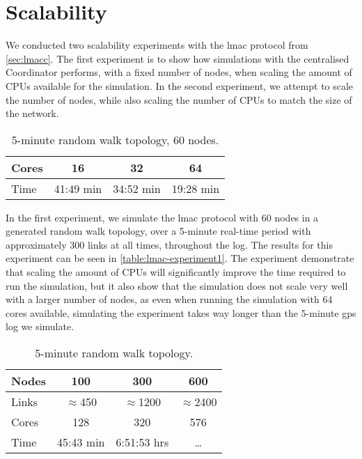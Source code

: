 \section{Scalability}\label{sec:scalability}
We conducted two scalability experiments with the \gls{lmac} protocol from \autoref{sec:lmacc}. The first
experiment is to show how simulations with the centralised Coordinator performs, with a fixed number of nodes,
when scaling the amount of CPUs available for the simulation. In the second experiment, we attempt to scale
the number of nodes, while also scaling the number of CPUs to match the size of the network.

\begin{table}[H]
    \begin{tabular}{|l|c|c|c|}
        \hline
        Cores & 16        & 32        & 64        \\ \hline
        Time  & 41:49 min & 34:52 min & 19:28 min \\ \hline
    \end{tabular}
    \caption{5-minute random walk topology, 60 nodes.}\label{table:lmac-experiment1}
\end{table}

In the first experiment, we simulate the \gls{lmac} protocol with 60 nodes in a generated random walk
topology, over a 5-minute real-time period with approximately 300 links at all times, throughout the log. The
results for this experiment can be seen in \autoref{table:lmac-experiment1}. The experiment demonstrate that
scaling the amount of CPUs will significantly improve the time required to run the simulation, but it also
show that the simulation does not scale very well with a larger number of nodes, as even when running the
simulation with 64 cores available, simulating the experiment takes way longer than the 5-minute \gls{gps} log
we simulate.

\begin{table}[H]
    \begin{tabular}{|l|c|c|c|}
        \hline
        Nodes & 100          & 300           & 600           \\ \hline
        Links & $\approx$450 & $\approx$1200 & $\approx$2400 \\ \hline
        Cores & 128          & 320           & 576           \\ \hline
        Time  & 45:43 min    & 6:51:53 hrs   & \dots         \\ \hline
    \end{tabular}
    \caption{5-minute random walk topology.}\label{table:lmac-experiment2}
\end{table}

